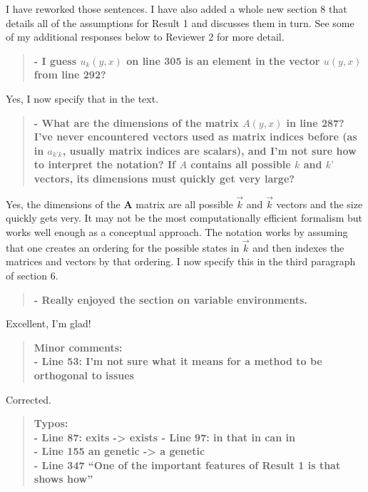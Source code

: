 \documentclass[10pt,parskip=full,foldmarks=off,addrfield=off,backaddress=false,refline=dateleft,letterpaper]{scrlttr2}
\newenvironment{reviewerquote}{\begin{quote}\color{DarkBlue}\bfseries}{\end{quote}}
\begin{document}
\begin{letter}
I have reworked those sentences. I have also added a whole new section 8 that details all of the assumptions for Result 1 and discusses them in turn. See some of my additional responses below to Reviewer 2 for more detail.

\begin{reviewerquote}
  - I guess $u_k(y,x)$ on line 305 is an element in the vector $u(y,x)$ from line 292?
\end{reviewerquote}

Yes, I now specify that in the text.

\begin{reviewerquote}
  - What are the dimensions of the matrix $A(y,x)$ in line 287? I’ve never encountered vectors used as matrix indices before (as in $a_{k’k}$, usually matrix indices are scalars), and I’m not sure how to interpret the notation? If $A$ contains all possible $k$ and $k’$ vectors, its dimensions must quickly get very large?
\end{reviewerquote}

Yes, the dimensions of the $\mathbf{A}$ matrix are all possible $\vec{k}$ and $\vec{k}$ vectors and the size quickly gets very. It may not be the most computationally efficient formalism but works well enough as a conceptual approach. The notation works by assuming that one creates an ordering for the possible states in $\vec{k}$ and then indexes the matrices and vectors by that ordering. I now specify this in the third paragraph of section 6.

\begin{reviewerquote}
  - Really enjoyed the section on variable environments.
\end{reviewerquote}

Excellent, I'm glad!

\begin{reviewerquote}
Minor comments:\\
- Line 53: I’m not sure what it means for a method to be orthogonal to issues
\end{reviewerquote}

Corrected.

\begin{reviewerquote}
Typos:\\
- Line 87: exits -> exists
- Line 97: in that in can in\\
- Line 155 an genetic -> a genetic\\
- Line 347 “One of the important features of Result 1 is that shows how”
\end{reviewerquote}


\end{letter}
\end{document}
